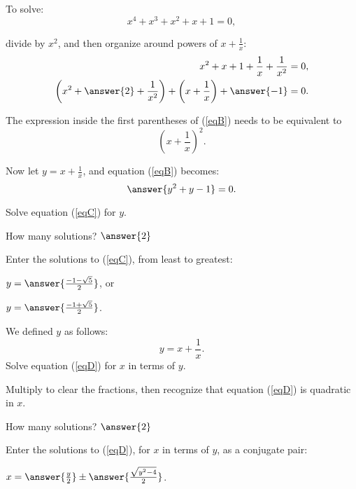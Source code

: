 \documentclass[space,nooutcomes]{ximera}
\begin{document}
\begin{problem}

To solve: 
\begin{equation}
x^4+x^3+x^2+x+1=0,
\end{equation}

divide by $x^2$, and then organize around powers of $x + \frac{1}{x}$: 
\begin{align}
x^2+x+1+\frac{1}{x}+\frac{1}{x^2}&=0, \\
\left(x^2+ \answer{2} + \frac{1}{x^2}\right)+ \left(x+\frac{1}{x}\right)+\answer{-1}&=0. \label{eqB}
\end{align}
\begin{hint}
The expression inside the first parentheses of (\ref{eqB}) needs to be equivalent to 
\[
\left(x+\frac{1}{x}\right)^2.
\]
\end{hint}
\begin{problem}
Now let $y = x + \frac{1}{x}$, and equation (\ref{eqB}) becomes: 
\begin{equation} \label{eqC}
\answer{y^2+y-1}=0.
\end{equation}

Solve equation (\ref{eqC}) for $y$.

How many solutions?  $\answer{2}$ 

\begin{problem}
Enter the solutions to (\ref{eqC}), from least to greatest: 

\begin{prompt}
$y = \answer{\frac{-1-\sqrt{5}}{2}}$, or 

$y = \answer{\frac{-1+\sqrt{5}}{2}}$.
\end{prompt}

\end{problem}
\end{problem}
\end{problem}

\begin{problem}
We defined $y$ as follows: 
\begin{equation} \label{eqD}
y = x + \frac{1}{x}.  
\end{equation}
Solve equation (\ref{eqD}) for $x$ in terms of $y$.  
\begin{hint}
Multiply to clear the fractions, then recognize that equation (\ref{eqD}) is quadratic in $x$.  
\end{hint}

How many solutions?  $\answer{2}$ 
\begin{problem}
\begin{prompt}
Enter the solutions to (\ref{eqD}), for $x$ in terms of $y$, as a conjugate pair: 

$x = \answer{\frac{y}{2}} \pm \answer{\frac{\sqrt{y^2-4}}{2}}$.
\end{prompt}

\end{problem}
\end{problem}
\end{document}
